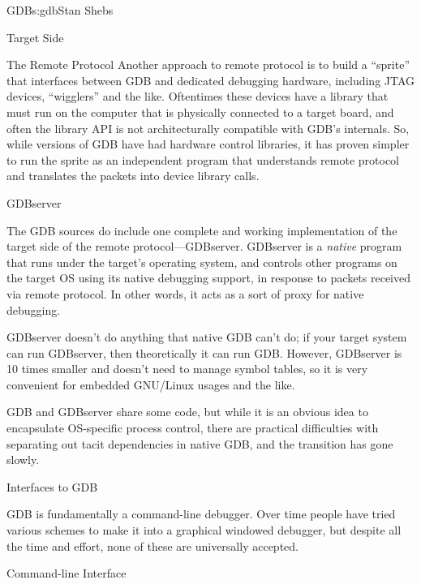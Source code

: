 \begin{aosachapter}{GDB}{s:gdb}{Stan Shebs}
\begin{aosasect1}{Target Side}
\begin{aosasect2}{The Remote Protocol}
Another approach to remote protocol is to build a ``sprite'' that
interfaces between GDB and dedicated debugging hardware, including
JTAG devices, ``wigglers'' and the like.  Oftentimes these devices
have a library that must run on the computer that is physically
connected to a target board, and often the library API is not
architecturally compatible with GDB's internals.  So, while versions of
GDB have had hardware control libraries, it has proven simpler to run
the sprite as an independent program that understands remote protocol
and translates the packets into device library calls.

\end{aosasect2}

\begin{aosasect2}{GDBserver}

The GDB sources do include one complete and working implementation of
the target side of the remote protocol---GDBserver.  GDBserver is a
{\em native} program that runs under the target's operating system,
and controls other programs on the target OS using its native
debugging support, in response to packets received via remote protocol.
In other words, it acts as a sort of proxy for native debugging.

GDBserver doesn't do anything that native GDB can't do; if your target
system can run GDBserver, then theoretically it can run GDB.  However,
GDBserver is 10 times smaller and doesn't need to manage symbol
tables, so it is very convenient for embedded GNU/Linux usages and the
like.


GDB and GDBserver share some code, but while it is an obvious idea to
encapsulate OS-specific process control, there are practical difficulties
with separating out tacit dependencies in native GDB, and the transition
has gone slowly.

\end{aosasect2}

\end{aosasect1}

\begin{aosasect1}{Interfaces to GDB}

GDB is fundamentally a command-line debugger.  Over time people have
tried various schemes to make it into a graphical windowed debugger,
but despite all the time and effort, none of these are universally
accepted.

\begin{aosasect2}{Command-line Interface}


\end{aosasect2}
\end{aosasect1}
\end{aosachapter}
